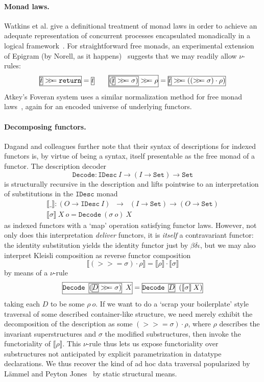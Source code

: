 \newcommand{\bind}{>\!\!>\!\!=}
\paragraph{Monad laws.} Watkins et al. give a definitional treatment
of monad laws in order to achieve
an adequate representation of concurrent processes encapsulated
monadically in a logical
framework~\cite{DBLP:conf/types/WatkinsCPW03}.
For straightforward free monads, an experimental extension of Epigram (by
Norell, as it happens)~\cite{PigWeekNu} suggests that we may readily allow
$\nu$-rules:
\[
\fbb{$\fba{$t$}\bind\mathtt{return}$} = \fba{$t$}
\qquad
\fbc{\(\fbb{\((\fba{$t$}\bind \sigma)\)}\bind\rho\)} =
\fbb{\(\fba{$t$}\bind((\bind \sigma)\cdot\rho)\)}
\]
Atkey's Foveran system uses a
similar normalization method for free monad laws~\cite{FusionMonad},
again for an encoded universe of underlying functors.

\paragraph{Decomposing functors.} Dagand and colleagues further
note that their syntax of descriptions for indexed functors is, by virtue of being
a syntax, itself presentable as the free monad of a functor. The
description decoder
\[
  \mathtt{Decode} : \mathtt{IDesc}\:I \to (I \to \mathtt{Set})
  \to \mathtt{Set}
\]
is structurally recursive in the description and lifts pointwise to
an interpretation of substitutions in the \(\mathtt{IDesc}\) monad
\[\begin{array}{l}
  \llbracket\_\rrbracket :
  (O \to \mathtt{IDesc}\:I) \;\;\to\;\;
     (I \to \mathtt{Set}) \to  (O \to \mathtt{Set}) \\
  \llbracket \sigma \rrbracket\:X\:o = \mathtt{Decode}\:(\sigma\:o)\:X
\end{array}\]
as indexed
functors with a `map' operation satisfying functor laws. However, not
only does this interpretation \emph{deliver} functors, it is
\emph{itself} a contravariant functor: the identity substitution yields
the identity functor just by $\beta\delta\iota$, but we may also
interpret Kleisli composition as reverse functor composition
\[
  \llbracket (>\!\!>\!\!=\sigma)\cdot\rho \rrbracket =
    \llbracket \rho \rrbracket \cdot \llbracket \sigma \rrbracket
\]
by means of a $\nu$-rule
\[
  \fbc{Decode~\fbb{$(\fba{$D$}>\!\!>\!\!=\sigma)$}~$X$} =
  \fbb{Decode~\fba{$D$}~$(\llbracket\sigma\rrbracket\:X)$}
\]
taking each $D$ to be some $\rho\:o$. If we want to do a `scrap your
boilerplate' style traversal of some described container-like
structure, we need merely exhibit the decomposition of the description as some
$(>\!\!>\!\!=\sigma)\cdot\rho$, where $\rho$ describes the invariant
superstructures and $\sigma$ the modified substructures, then invoke
the functoriality of $\llbracket \rho \rrbracket$. This $\nu$-rule
thus lets us expose functoriality over substructures not anticipated by explicit
parametrization in datatype declarations. We thus recover the kind of
ad hoc data traversal popularized by L\"ammel and Peyton
Jones~\cite{DBLP:conf/tldi/LammelJ03} by static structural means.

